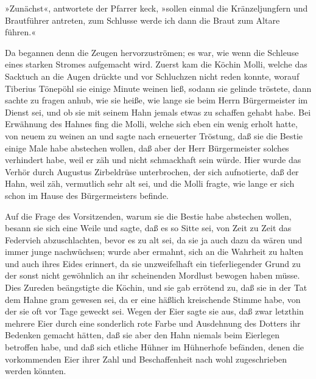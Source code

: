 »Zunächst«, antwortete der Pfarrer keck, »sollen einmal die
Kränzeljungfern und Brautführer antreten, zum Schlusse werde ich
dann die Braut zum Altare führen.«

Da begannen denn die Zeugen hervorzuströmen; es war, wie wenn die
Schleuse eines starken Stromes aufgemacht wird. Zuerst kam die
Köchin Molli, welche das Sacktuch an die Augen drückte und vor
Schluchzen nicht reden konnte, worauf Tiberius Tönepöhl sie einige
Minute weinen ließ, \pagenum{[27]} sodann sie gelinde tröstete,
dann sachte zu fragen anhub, wie sie heiße, wie lange sie beim
Herrn Bürgermeister im Dienst sei, und ob sie mit seinem Hahn
jemals etwas zu schaffen gehabt habe. Bei Erwähnung des Hahnes fing
die Molli, welche sich eben ein wenig erholt hatte, von neuem zu
weinen an und sagte nach erneuerter Tröstung, daß sie die Bestie
einige Male habe abstechen wollen, daß aber der Herr Bürgermeister
solches verhindert habe, weil er zäh und nicht schmackhaft sein
würde. Hier wurde das Verhör durch Augustus Zirbeldrüse
unterbrochen, der sich aufnotierte, daß der Hahn, weil zäh,
vermutlich sehr alt sei, und die Molli fragte, wie lange er sich
schon im Hause des Bürgermeisters befinde.

Auf die Frage des Vorsitzenden, warum sie die Bestie habe abstechen
wollen, besann sie sich eine Weile und sagte, daß es so Sitte sei,
von Zeit zu Zeit das Federvieh abzuschlachten, bevor es zu alt sei,
da sie ja auch dazu da wären und immer junge nachwüchsen; wurde
aber ermahnt, sich an die Wahrheit zu halten und auch ihres Eides
erinnert, da sie unzweifelhaft ein tieferliegender Grund zu der
sonst nicht gewöhnlich an ihr scheinenden Mordlust bewogen haben
müsse. Dies Zureden beängstigte die Köchin, und sie gab errötend
zu, daß sie in der Tat dem Hahne gram gewesen sei, da er eine
häßlich kreischende Stimme habe, von der sie oft vor Tage geweckt
sei. Wegen der Eier sagte sie aus, daß zwar letzthin mehrere Eier
durch eine sonderlich rote Farbe und Ausdehnung des Dotters ihr
Bedenken gemacht hätten, daß sie aber den Hahn niemals beim
Eierlegen betroffen habe, und daß sich etliche Hühner im Hühnerhofe
befänden, denen die vorkommenden Eier ihrer Zahl und Beschaffenheit
nach wohl zugeschrieben werden könnten.

